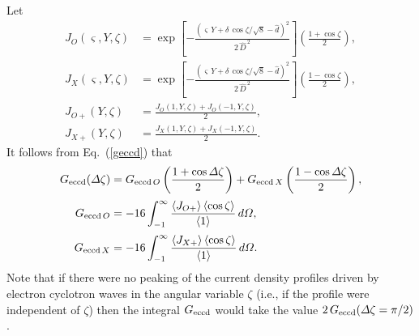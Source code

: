 \documentclass{iopjournal}
\begin{document}
Let 
\begin{align}
J_O(\varsigma,Y,\zeta) &=  \exp\!\left[-\frac{(\varsigma\,Y+\delta\,\cos\zeta/\sqrt{8}-\hat{d})^2}{2\,\hat{D}^{\,2}}\right]\left(\frac{1+\cos\zeta}{2}\right),\\[0.5ex]
J_X(\varsigma,Y,\zeta) &=  \exp\!\left[-\frac{(\varsigma\,Y+\delta\,\cos\zeta/\sqrt{8}-\hat{d})^2}{2\,\hat{D}^{\,2}}\right]\left(\frac{1-\cos\zeta}{2}\right),\\[0.5ex]
J_{O+}(Y,\zeta) &= \frac{J_O(1,Y,\zeta) + J_O(-1,Y,\zeta)}{2},\\[0.5ex]
J_{X+}(Y,\zeta) &= \frac{J_X(1,Y,\zeta) + J_X(-1,Y,\zeta)}{2}.
\end{align}
It follows from Eq.~(\ref{geccd}) that
\begin{align}
G_{\rm eccd}({\mit\Delta}\zeta)& = G_{{\rm eccd}\,O}\left(\frac{1+\cos{\mit\Delta}\zeta}{2}\right)+G_{{\rm eccd}\,X}\left(\frac{1-\cos{\mit\Delta}\zeta}{2}\right),\\[0.5ex]
G_{{\rm eccd}\,O} &= - 16\int_{-1}^\infty \frac{\langle J_{O+}\rangle\,\langle \cos\zeta\rangle}{\langle 1\rangle}\,d{\mit\Omega},\\[0.5ex]
G_{{\rm eccd}\,X} &= - 16\int_{-1}^\infty \frac{\langle J_{X+}\rangle\,\langle \cos\zeta\rangle}{\langle 1\rangle}\,d{\mit\Omega}.
\end{align}
Note that if there were no peaking of the current density profiles driven by electron cyclotron waves in the angular variable $\zeta$ (i.e., if the profile were
independent of $\zeta$) then the integral $G_{\rm eccd}$ would take the value  $2\,G_{\rm eccd}({\mit\Delta}\zeta= \pi/2)$.
\end{document}
